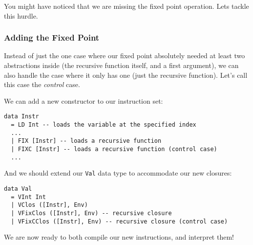 You might have noticed that we are missing the fixed point operation. Lets tackle this hurdle.

\subsubsection{Adding the Fixed Point}

Instead of just the one case where our fixed point absolutely needed at least two abstractions inside (the recursive function itself, and a first argument), 
we can also handle the case where it only has one (just the recursive function). Let's call this case the \textit{control} case.

We can add a new constructor to our instruction set:
\begin{lstlisting}
data Instr
  = LD Int -- loads the variable at the specified index 
  ...
  | FIX [Instr] -- loads a recursive function
  | FIXC [Instr] -- loads a recursive function (control case)
  ...
\end{lstlisting}

And we should extend our \texttt{Val} data type to accommodate our new closures:

\begin{lstlisting}
data Val
  = VInt Int
  | VClos ([Instr], Env)
  | VFixClos ([Instr], Env) -- recursive closure
  | VFixCClos ([Instr], Env) -- recursive closure (control case)
\end{lstlisting}

We are now ready to both compile our new instructions, and interpret them!

